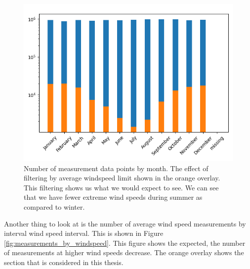 \begin{figure}
    \centering
    \includegraphics[scale = 0.75]{Figures/measurements_by_month.png}
    \caption[Number of measurement data points by month.]{Number of measurement data points by month. The effect of filtering by average windspeed limit shown in the orange overlay. This filtering shows us what we would expect to see. We can see that we have fewer extreme wind speeds during summer as compared to winter.}
    \label{fig:measurements_by_month}
\end{figure}

Another thing to look at is the number of average wind speed measurements by interval wind speed interval. This is shown in Figure \ref{fig:measurements_by_windspeed}. This figure shows the expected, the number of measurements at higher wind speeds decrease. The orange overlay shows the section that is considered in this thesis.


